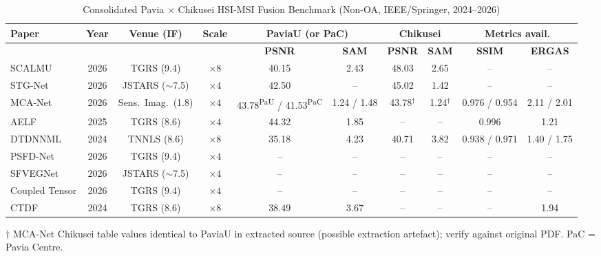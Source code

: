 \documentclass[conference]{IEEEtran}
\begin{document}
\begin{table}[htbp]
\caption{Consolidated Pavia $\times$ Chikusei HSI-MSI Fusion Benchmark (Non-OA, IEEE/Springer, 2024--2026)}
\label{tab:pavia_chikusei}
\begin{center}
\begin{adjustbox}{width=\textwidth}
\begin{tabular}{p{2.4cm}c|c|c|cc|cc|cc}
\toprule
\textbf{Paper} & \textbf{Year} & \textbf{Venue (IF)} & \textbf{Scale} &
\multicolumn{2}{c|}{\textbf{PaviaU (or PaC)}} &
\multicolumn{2}{c|}{\textbf{Chikusei}} &
\multicolumn{2}{c}{\textbf{Metrics avail.}} \\
\midrule
 & & & & \textbf{PSNR} & \textbf{SAM} & \textbf{PSNR} & \textbf{SAM} & \textbf{SSIM} & \textbf{ERGAS} \\
\midrule
SCALMU \cite{xu2026scalmu} & 2026 & TGRS (9.4) & $\times 8$ & 40.15 & 2.43 & 48.03 & 2.65 & -- & -- \\
STG-Net \cite{stgnet2026} & 2026 & JSTARS ($\sim$7.5) & $\times 4$ & 42.50 & -- & 45.02 & 1.42 & -- & -- \\
MCA-Net \cite{mcanet2026} & 2026 & Sens.\ Imag.\ (1.8) & $\times 4$ & 43.78\textsuperscript{PaU} / 41.53\textsuperscript{PaC} & 1.24 / 1.48 & 43.78$^{\dagger}$ & 1.24$^{\dagger}$ & 0.976 / 0.954 & 2.11 / 2.01 \\
AELF \cite{aelf2025} & 2025 & TGRS (8.6) & $\times 4$ & 44.32 & 1.85 & -- & -- & 0.996 & 1.21 \\
DTDNNML \cite{dtdnnml2024} & 2024 & TNNLS (8.6) & $\times 8$ & 35.18 & 4.23 & 40.71 & 3.82 & 0.938 / 0.971 & 1.40 / 1.75 \\
PSFD-Net \cite{psfdnet2026} & 2026 & TGRS (9.4) & $\times 4$ & -- & -- & -- & -- & -- & -- \\
SFVEGNet \cite{sfvegnet2026} & 2026 & JSTARS ($\sim$7.5) & $\times 4$ & -- & -- & -- & -- & -- & -- \\
Coupled Tensor \cite{coupled2026} & 2026 & TGRS (9.4) & $\times 4$ & -- & -- & -- & -- & -- & -- \\
CTDF \cite{ctdf2024} & 2024 & TGRS (8.6) & $\times 8$ & 38.49 & 3.67 & -- & -- & -- & 1.94 \\
\bottomrule
\end{tabular}
\end{adjustbox}
\end{center}
\footnotesize{$\dagger$ MCA-Net Chikusei table values identical to PaviaU in extracted source (possible extraction artefact); verify against original PDF. PaC = Pavia Centre.}
\end{table}
\end{document}
